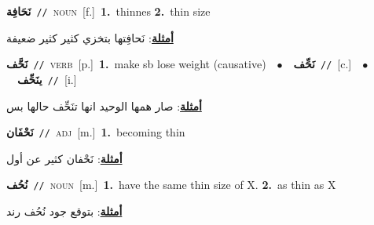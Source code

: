 \documentclass[10pt,a4paper,twoside]{article} %
\begin{document}
\begin{multicols}{2}
{\setlength\topsep{0pt}\textbf{\foreignlanguage{arabic}{نَحَافِة}}\ {\color{gray}\texttt{//}\color{black}}\ \textsc{noun}\ [f.]\ \textbf{1.}~thinnes  \textbf{2.}~thin size\  \begin{flushright}\color{gray}\foreignlanguage{arabic}{\textbf{\underline{\foreignlanguage{arabic}{أمثلة}}}: نَحافِتها بتخزي كثير كثير ضعيفة}\end{flushright}\color{black}} \vspace{2mm}

{\setlength\topsep{0pt}\textbf{\foreignlanguage{arabic}{نَحَّف}}\ {\color{gray}\texttt{//}\color{black}}\ \textsc{verb}\ [p.]\ \textbf{1.}~make sb lose weight (causative)\ \ $\bullet$\ \ \setlength\topsep{0pt}\textbf{\foreignlanguage{arabic}{نَحِّف}}\ {\color{gray}\texttt{//}\color{black}}\ [c.]\ \ $\bullet$\ \ \setlength\topsep{0pt}\textbf{\foreignlanguage{arabic}{ينَحِّف}}\ {\color{gray}\texttt{//}\color{black}}\ [i.]\  \begin{flushright}\color{gray}\foreignlanguage{arabic}{\textbf{\underline{\foreignlanguage{arabic}{أمثلة}}}: صار همها الوحيد انها تنَحِّف حالها بس}\end{flushright}\color{black}} \vspace{2mm}

{\setlength\topsep{0pt}\textbf{\foreignlanguage{arabic}{نَحْفَان}}\ {\color{gray}\texttt{//}\color{black}}\ \textsc{adj}\ [m.]\ \textbf{1.}~becoming thin\  \begin{flushright}\color{gray}\foreignlanguage{arabic}{\textbf{\underline{\foreignlanguage{arabic}{أمثلة}}}: نَحْفان كثير عن أول}\end{flushright}\color{black}} \vspace{2mm}

{\setlength\topsep{0pt}\textbf{\foreignlanguage{arabic}{نُحُف}}\ {\color{gray}\texttt{//}\color{black}}\ \textsc{noun}\ [m.]\ \textbf{1.}~have the same thin size of X.  \textbf{2.}~as thin as X\  \begin{flushright}\color{gray}\foreignlanguage{arabic}{\textbf{\underline{\foreignlanguage{arabic}{أمثلة}}}: بتوقع جود نُحُف رند}\end{flushright}\color{black}} \vspace{2mm}


\end{multicols}
\end{document}
